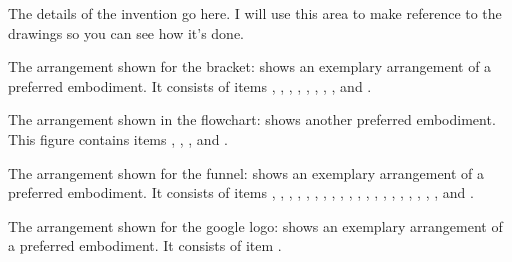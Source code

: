 
\npar The details of the invention go here. I will use this area to make reference to the drawings so you can see how it's done. 

\npar The arrangement shown for the bracket:  shows an 
exemplary arrangement of a preferred embodiment. It consists of items
, , , , 
, , , , and .

\npar The arrangement shown in the flowchart:  
shows another preferred embodiment. This figure contains items
, , , and .

\npar The arrangement shown for the funnel:  shows an 
exemplary arrangement of a preferred embodiment. It consists of items
, , , , 
, , , ,  
, , , ,  
, , , ,  
, , , , and .

\npar The arrangement shown for the google logo:  shows an 
exemplary arrangement of a preferred embodiment. It consists of item
.
